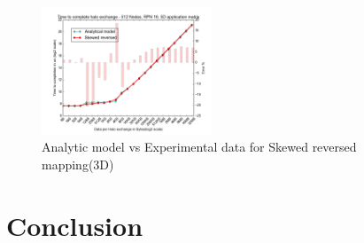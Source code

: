 \documentclass{acm_proc_article-sp}
\begin{document}
\begin{figure}
  \includegraphics[width=0.45\textwidth]{mappings/3d_skewed_reversed.png}
  \caption{Analytic model vs Experimental data for Skewed reversed mapping(3D)}
    \label{fig:3D_skewed_reversed}
\end{figure}

\section{Conclusion}





\end{document}
